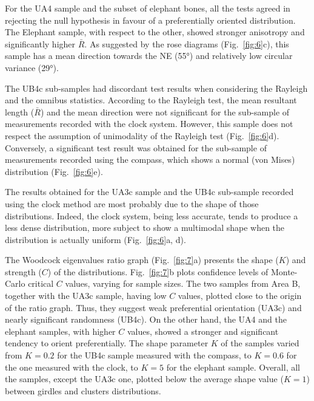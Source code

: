 \documentclass[preprint,authoryear,times]{elsarticle} %
\begin{document}
For the UA4 sample and the subset of elephant bones, all the tests agreed in rejecting the null hypothesis in favour of a preferentially oriented distribution. The Elephant sample, with respect to the other, showed stronger anisotropy and significantly higher $\bar{R}$. As suggested by the rose diagrams (Fig.~\ref{fig:6}c), this sample has a mean direction towards the NE (55°) and relatively low circular variance (29°).

The UB4c sub-samples had discordant test results when considering the Rayleigh and the omnibus statistics. According to the Rayleigh test, the mean resultant length ($\bar{R}$) and the mean direction were not significant for the sub-sample of measurements recorded with the clock system. However, this sample does not respect the assumption of unimodality of the Rayleigh test (Fig.~\ref{fig:6}d). Conversely, a significant test result was obtained for the sub-sample of measurements recorded using the compass, which shows a normal (von Mises) distribution (Fig.~\ref{fig:6}e). %

The results obtained for the UA3c sample and the UB4c sub-sample recorded using the clock method are most probably due to the shape of those distributions. Indeed, the clock system, being less accurate, tends to produce a less dense distribution, more subject to show a multimodal shape when the distribution is actually uniform (Fig.~\ref{fig:6}a, d).

The Woodcock eigenvalues ratio graph (Fig.~\ref{fig:7}a) presents the shape ($K$) and strength ($C$) of the distributions. Fig.~\ref{fig:7}b plots confidence levels of Monte-Carlo critical $C$ values, varying for sample sizes. The two samples from Area B, together with the UA3c sample, having low $C$ values, plotted close to the origin of the ratio graph. Thus, they suggest weak preferential orientation (UA3c) and nearly significant randomness (UB4c). On the other hand, the UA4 and the elephant samples, with higher $C$ values, showed a stronger and significant tendency to orient preferentially. The shape parameter $K$ of the samples varied from $K=0.2$ for the UB4c sample measured with the compass, to $K=0.6$ for the one measured with the clock, to $K=5$ for the elephant sample. Overall, all the samples, except the UA3c one, plotted below the average shape value ($K=1$) between girdles and clusters distributions.
\end{document}
